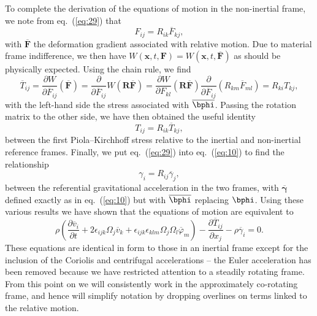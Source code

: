 To complete the derivation of the equations of motion in the non-inertial frame, we note from eq.~(\ref{eq:29}) that
\begin{equation}
F_{ij}=R_{ik}\overline{F}_{kj},
\label{eq:36}
\end{equation}
with $\overline{\mathbf{F}}$ the deformation gradient associated with relative motion. Due to material frame 
indifference, we then have $W(\mathbf{x},t,\mathbf{F})=W(\mathbf{x},t,\overline{\mathbf{F}})$ as should be physically  
expected. Using the chain rule, we find
\begin{equation}
\overline{T}_{ij}=\frac{\partial W}{\partial\overline{F}_{ij}}(\overline{\mathbf{F}})=\frac{\partial}{\partial
\overline{F}_{ij}}W(\mathbf{R}\overline{\mathbf{F}})=\frac{\partial W}{\partial F_{kl}}(\mathbf{R}\overline{\mathbf{F}})
\frac{\partial}{\partial\overline{F}_{ij}}(R_{km}\overline{F}_{ml})=R_{ki}T_{kj},
\label{eq:37}
\end{equation}
with the left-hand side the stress associated with $\overline{\bphi}$. Passing the rotation matrix to the 
other side, we have then obtained the useful identity
\begin{equation}
T_{ij}=R_{ik}\overline{T}_{kj},
\label{eq:38}
\end{equation}
between the first Piola--Kirchhoff stress relative to the inertial and non-inertial reference frames. Finally, we put 
eq.~(\ref{eq:29}) into eq.~(\ref{eq:10}) to find the relationship
\begin{equation}
\gamma_{i}=R_{ij}\overline{\gamma}_{j},
\label{eq:39}
\end{equation}
between the referential gravitational acceleration in the two frames, with $\overline{\bm{\gamma}}$ defined 
exactly as in eq.~(\ref{eq:10}) but with $\overline{\bphi}$ replacing $\bphi$. Using these various 
results we have shown that the equations of motion are equivalent to
\begin{equation}
\rho\left(\frac{\partial\overline{v}_{i}}{\partial t}+2\epsilon_{ijk}\Omega_{j}\overline{v}_{k}+\epsilon_{ijk}
\epsilon_{klm}\Omega_{j}\Omega_{l}\overline{\varphi}_{m}\right)-\frac{\partial\overline{T}_{ij}}{\partial x_{j}}-\rho\overline{\gamma}_{i}=0.
\label{eq:40}
\end{equation}
These equations are identical in form to those in an inertial frame except for the inclusion of the Coriolis and 
centrifugal accelerations -- the Euler acceleration has been removed because we have restricted attention to a 
steadily rotating frame. From this point on we will consistently work in the approximately co-rotating frame, 
and hence will simplify notation by dropping overlines on terms linked to the relative motion. 

